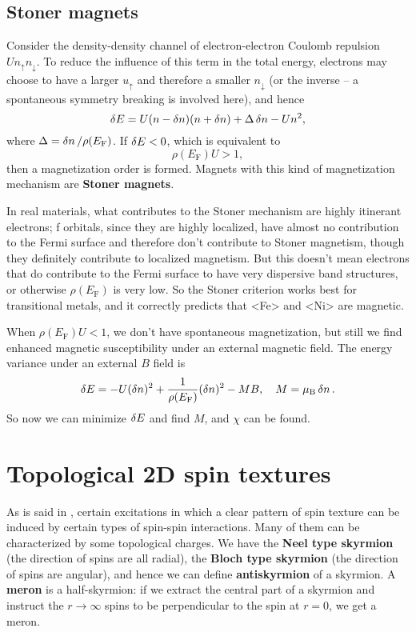 \documentclass[hyperref, a4paper]{article}
\newcommand*{\concept}[1]{{\textbf{#1}}}
\def\ce#1{<#1>}%
\newcommand*{\efermi}{E_{\text{F}}}
\begin{document}
\subsection{Stoner magnets}

Consider the density-density channel of electron-electron Coulomb repulsion $U n_\uparrow n_\downarrow$. 
To reduce the influence of this term in the total energy, 
electrons may choose to have a larger $u_\uparrow$ and therefore a smaller $n_{\downarrow}$
(or the inverse -- a spontaneous symmetry breaking is involved here),
and hence 
\begin{equation}
    \var{E} = U (n - \var{n}) (n + \var{n}) + \Delta \var{n} - U n^2,
\end{equation}
where $\Delta = \var{n} / \rho(\efermi)$.
If $\var{E} < 0$, which is equivalent to 
\begin{equation}
    \rho(\efermi) U > 1,
\end{equation}
then a magnetization order is formed. 
Magnets with this kind of magnetization mechanism 
are \concept{Stoner magnets}.

In real materials, 
what contributes to the Stoner mechanism 
are highly itinerant electrons;
f orbitals, since they are highly localized, 
have almost no contribution to the Fermi surface 
and therefore don't contribute to Stoner magnetism,
though they definitely contribute to localized magnetism.
But this doesn't mean electrons that do contribute to the Fermi surface 
to have very dispersive band structures,
or otherwise $\rho(\efermi)$ is very low. 
So the Stoner criterion works best for transitional metals, 
and it correctly predicts that \ce{Fe} and \ce{Ni} are magnetic.

When $\rho(\efermi) U < 1$, 
we don't have spontaneous magnetization, 
but still we find enhanced magnetic susceptibility under an external magnetic field. 
The energy variance under an external $B$ field is 
\begin{equation}
    \var{E} = - U (\var{n})^2 
    + \frac{1}{\rho(\efermi)} (\var{n})^2
    - M B, \quad 
    M = \mu_\text{B} \var{n}.
\end{equation}
So now we can minimize $\var{E}$ and find $M$, 
and $\chi$ can be found. 

\section{Topological 2D spin textures}

As is said in , 
certain excitations in which a clear pattern of spin texture 
can be induced by certain types of spin-spin interactions.
Many of them can be characterized by 
some topological charges. 
We have the \concept{Neel type skyrmion} 
(the direction of spins are all radial), 
the \concept{Bloch type skyrmion}
(the direction of spins are angular),
and hence we can define 
\concept{antiskyrmion} of a skyrmion.
A \concept{meron} is a half-skyrmion: 
if we extract the central part of a skyrmion 
and instruct the $r \to \infty$ spins to be perpendicular to the spin at $r=0$,
we get a meron.
\end{document}
